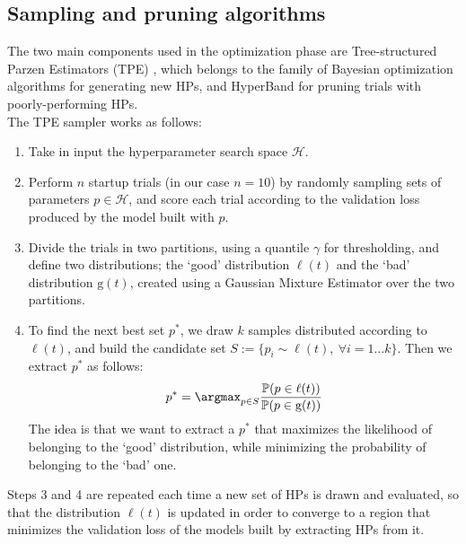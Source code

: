 
\subsection{Sampling and pruning algorithms} %
\noindent
The two main components used in the optimization phase are Tree-structured Parzen Estimators (TPE) \cite{bergstra2011algorithms}, which belongs to the family of Bayesian optimization algorithms for generating new HPs, and HyperBand \cite{li2018hyperband} for pruning trials with poorly-performing HPs.\\
The TPE sampler works as follows:
\begin{enumerate}
    \item Take in input the hyperparameter search space $\mathcal{H}$.
    \item Perform $n$ startup trials (in our case $n = 10$) by randomly sampling sets of parameters $p\in\mathcal{H}$, and score each trial according to the validation loss produced by the model built with $p$.
    \item Divide the trials in two partitions, using a quantile $\gamma$ for thresholding, and define two distributions; the `good' distribution $\ell(t)$ and the `bad' distribution $\mathrm{g}(t)$, created using a Gaussian Mixture Estimator over the two partitions.
    \item To find the next best set $p^*$, we draw $k$ samples distributed according to $\ell(t)$, and build the candidate set $S :=\{p_i\sim\ell(t),~\forall i = 1\dots k\}$. Then we extract $p^*$ as follows:
    $$ 
        p^* = \argmax_{p\in S} \frac{\mathbb{P}(p\in\ell(t))}{\mathbb{P}(p\in\mathrm{g}(t))}
    $$
    The idea is that we want to extract a $p^*$ that maximizes the likelihood of belonging to the `good' distribution, while minimizing the probability of belonging to the `bad' one.
\end{enumerate}

\noindent
Steps 3 and 4 are repeated each time a new set of HPs is drawn and evaluated, so that the distribution $\ell(t)$ is updated in order to converge to a region that minimizes the validation loss of the models built by extracting HPs from it.\\

